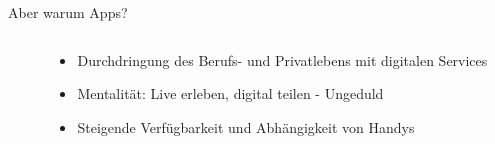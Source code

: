 \begin{frame}{Aber warum Apps?}
    \begin{columns}
        \begin{column}{0.5\textwidth}
        \end{column}
        \begin{column}{0.5\textwidth}
            \begin{itemize}
                \item<3-> Durchdringung des Berufs- und Privatlebens mit digitalen Services
                \item<3-> Mentalität: Live erleben, digital teilen - Ungeduld
                \item<4-> Steigende Verfügbarkeit und Abhängigkeit von Handys
            \end{itemize}
        \end{column}
    \end{columns}
\end{frame}

